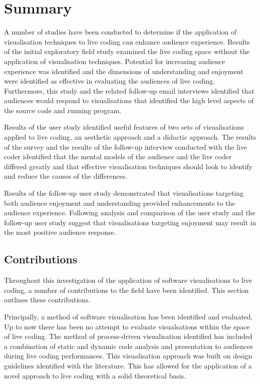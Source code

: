 
\chapter{Summary}
\label{chap:summary}

A number of studies have been conducted to determine if the application of visualisation techniques to live coding can enhance audience experience. Results of the initial exploratory field study examined the live coding space without the application of visualisation techniques. Potential for increasing audience experience was identified and the dimensions of understanding and enjoyment were identified as effective in evaluating the audiences of live coding. Furthermore, this study and the related follow-up email interviews identified that audiences would respond to visualisations that identified the high level aspects of the source code and running program.

Results of the user study identified useful features of two sets of visualisations applied to live coding, an aesthetic approach and a didactic approach. The results of the survey and the results of the follow-up interview conducted with the live coder identified that the mental models of the audience and the live coder differed greatly and that effective visualisation techniques should look to identify and reduce the causes of the differences.

Results of the follow-up user study demonstrated that visualisations targeting  both audience enjoyment and understanding provided enhancements to the audience experience. Following analysis and comparison of the user study and the follow-up user study suggest that visualisations targeting enjoyment may result in the most positive audience response.

\section{Contributions}

Throughout this investigation of the application of software visualisations to live coding, a number of contributions to the field have been identified. This section outlines these contributions.

Principally, a method of software visualisation has been identified and evaluated. Up to now there has been no attempt to evaluate visualsations within the space of live coding. The method of process-driven visualisation identified has included a combination of static and dynamic code analysis and presentation to audiences during live coding performances. This visualisation approach was built on design guidelines identified with the literature. This has allowed for the application of a novel approach to live coding with a solid theoretical basis.

